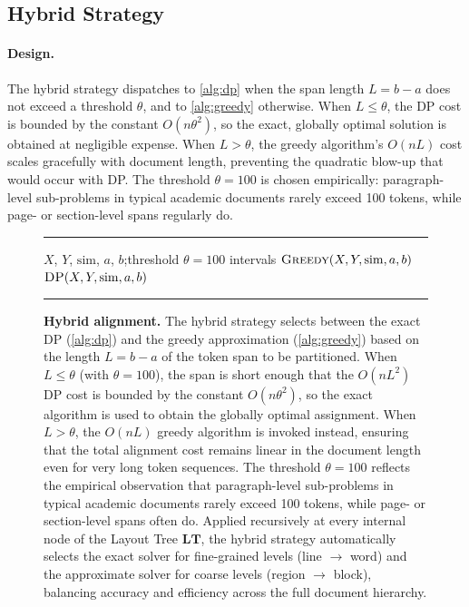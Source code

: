 \documentclass{article}
\theoremstyle{definition}
\newcommand{\LT}{\mathbf{LT}}
\begin{document}
\subsection{Hybrid Strategy}
\label{sec:hybrid}

\paragraph{Design.}
The hybrid strategy dispatches to \cref{alg:dp} when the span length $L = b - a$
does not exceed a threshold $\theta$, and to \cref{alg:greedy} otherwise.
When $L \le \theta$, the DP cost is bounded by the constant $O(n\theta^2)$,
so the exact, globally optimal solution is obtained at negligible expense.
When $L > \theta$, the greedy algorithm's $O(nL)$ cost scales gracefully with
document length, preventing the quadratic blow-up that would occur with DP.
The threshold $\theta = 100$ is chosen empirically: paragraph-level
sub-problems in typical academic documents rarely exceed 100 tokens, while
page- or section-level spans regularly do.

\begin{figure}[h]
  \centering
  \hrule\vspace{4pt}
  \begin{minipage}{0.92\linewidth}
    \begin{algorithmic}[1]
      \Require $X$, $Y$, $\mathrm{sim}$, $a$, $b$;\quad threshold $\theta = 100$
      \Ensure intervals
      \State \Return $\textsc{Greedy}(X, Y, \mathrm{sim}, a, b)$
      \Else
      \State \Return $\textsc{DP}(X, Y, \mathrm{sim}, a, b)$
      \EndIf
    \end{algorithmic}
  \end{minipage}
  \vspace{4pt}\hrule
  \caption{%
    \textbf{Hybrid alignment.}
    The hybrid strategy selects between the exact DP (\cref{alg:dp}) and the
    greedy approximation (\cref{alg:greedy}) based on the length $L = b - a$
    of the token span to be partitioned.
    When $L \le \theta$ (with $\theta = 100$), the span is short enough that
    the $O(nL^2)$ DP cost is bounded by the constant $O(n\theta^2)$, so the
    exact algorithm is used to obtain the globally optimal assignment.
    When $L > \theta$, the $O(nL)$ greedy algorithm is invoked instead,
    ensuring that the total alignment cost remains linear in the document
    length even for very long token sequences.
    The threshold $\theta = 100$ reflects the empirical observation that
    paragraph-level sub-problems in typical academic documents rarely exceed
    100 tokens, while page- or section-level spans often do.
    Applied recursively at every internal node of the Layout Tree $\LT$,
    the hybrid strategy automatically selects the exact solver for fine-grained
    levels (line $\to$ word) and the approximate solver for coarse levels
    (region $\to$ block), balancing accuracy and efficiency across the
    full document hierarchy.%
  }
  \label{alg:hybrid}
\end{figure}
\end{document}
